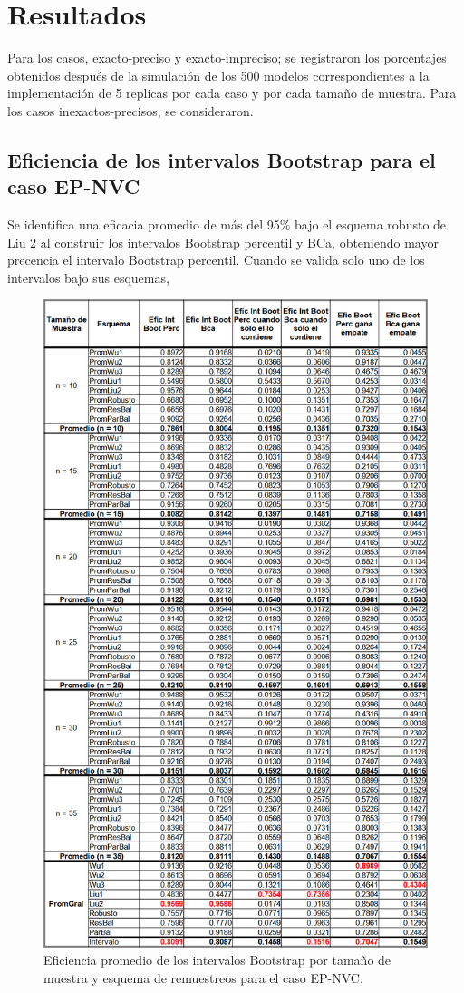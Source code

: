 \section{Resultados}
Para los casos, exacto-preciso y exacto-impreciso; se registraron los porcentajes obtenidos después de la simulación de los 500 modelos correspondientes a la implementación de 5 replicas por cada caso y por cada tamaño de muestra. Para los casos inexactos-precisos, se consideraron.


\subsection{Eficiencia de los intervalos Bootstrap para el caso EP-NVC}
Se identifica una eficacia promedio de más del 95\% bajo el esquema robusto de Liu 2 al construir los intervalos Bootstrap percentil y BCa, obteniendo mayor precencia el intervalo Bootstrap percentil. Cuando se valida solo uno de los intervalos bajo sus esquemas, 


\begin{figure}[H] 
	\centering 
	\includegraphics[width=0.55\linewidth]{img/EP_NVC_Efic_Boots.png} 
	\caption{Eficiencia promedio de los intervalos Bootstrap por tamaño de muestra y esquema de remuestreos para el caso EP-NVC.} 
	\label{fig:EP_NVC_Boots}
\end{figure}

\FloatBarrier

